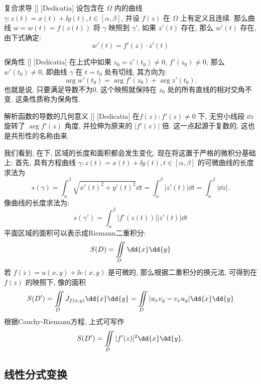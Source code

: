 \documentclass[UTF8]{ctexart}
\begin{document}
        \begin{thm}
            [UUID]
            {复合求导}
            []
            [Dedicatia]
            设包含在 \(\Omega\) 内的曲线 \(\gamma:z(t)=x(t)+\ii y(t), t\in[\alpha,\beta]\), 并设 \(f(z)\) 在 \(\Omega\) 上有定义且连续. 那么曲线 \(w=w(t)=f(z(t))\) 将 \(\gamma\) 映照到 \(\gamma'\), 如果 \(z'(t)\) 存在, 那么 \(w'(t)\) 存在, 由下式确定: 
            \[w'(t)=f'(z)\cdot z'(t)\]
        \end{thm}

        \begin{thm}
            [UUID]
            {保角性}
            []
            [Dedicatia]
            在上式中如果 \(z_0=z'(t_0)\neq 0\),  \(f'(z_0)\neq 0\), 那么 \(w'(t_0)\neq 0\), 即曲线 \(\gamma\) 在 \(t=t_0\) 处有切线, 其方向为: 
            \[\arg w'(t_0)=\arg f'(z_0)+\arg z'(t_0).\]
            也就是说, 只要满足导数不为0, 这个映照就保持在 \(z_0\) 处的所有直线的相对交角不变. 这条性质称为保角性. 
        \end{thm}

        \begin{crl}
            [UUID]
            {解析函数的导数的几何意义}
            []
            [Dedicatia]
            在\ConformalMapping  \(f(z): f'(z)\neq 0\) 下, 无穷小线段 \(\dd{z}\) 旋转了 \(\arg f'(z)\) 角度, 并拉伸为原来的 \(|f'(z)|\) 倍. 这一点起源于复数的\AngularForm, 这也是共形性的名称由来. 
        \end{crl}

        我们看到, 在\ConformalMapping 下, 区域的长度和面积都会发生变化. 现在将这置于严格的微积分基础上: 首先, 具有方程曲线 \(\gamma:z(t)=x(t)+\ii y(t), t\in[\alpha,\beta]\) 的可微曲线的长度求法为
        \[s(\gamma)=\int_\alpha^\beta\sqrt{x'(t)^2+y'(t)^2}\dd{t}=\int_{\alpha}^{\beta}|z'(t)|\dd{t}=\int_{\alpha}^\beta|\dd{z}|. \]
        像曲线的长度求法为: 
        \[s(\gamma')=\int_{\alpha}^{\beta}|f'(z(t))||z'(t)|\dd{t}\]
        平面区域的面积可以表示成Riemann二重积分: 
        \[S(D)=\iintop_D\dd{x}\dd{y}\]
        若 \(f(z)=u(x,y)+\ii v(x,y)\) 是可微的, 那么根据二重积分的换元法, 可得到在 \(f(z)\) 的映照下, 像的面积
        \[S(D')=\iintop_{D} J_{f(x,y)}\dd{x}\dd{y}=\iintop_{D}|u_xv_y-v_xu_y|\dd{x}\dd{y}\]
        根据Cauchy-Riemann方程, 上式可写作
        \[S(D')=\iintop_{D}|f'(z)|^2\dd{x}\dd{y}.\]
    
    \subsection{线性分式变换}
\end{document}
